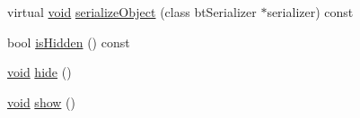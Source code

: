 \begin{DoxyCompactItemize}
\item 
virtual \mbox{\hyperlink{_thread_8h_af1e856da2e658414cb2456cb6f7ebc66}{void}} \mbox{\hyperlink{classnjli_1_1_label_h_u_d_a4fc4bcd9d1930911474210c047372fc0}{serialize\+Object}} (class bt\+Serializer $\ast$serializer) const
\item 
bool \mbox{\hyperlink{classnjli_1_1_label_h_u_d_a3009efb11b4bcd56bd933c21b230a125}{is\+Hidden}} () const
\item 
\mbox{\hyperlink{_thread_8h_af1e856da2e658414cb2456cb6f7ebc66}{void}} \mbox{\hyperlink{classnjli_1_1_label_h_u_d_a5d7b8b3bc421084f282343e506a6d289}{hide}} ()
\item 
\mbox{\hyperlink{_thread_8h_af1e856da2e658414cb2456cb6f7ebc66}{void}} \mbox{\hyperlink{classnjli_1_1_label_h_u_d_a73ffd499fceaacd59b518a541ed2133e}{show}} ()
\end{DoxyCompactItemize}
